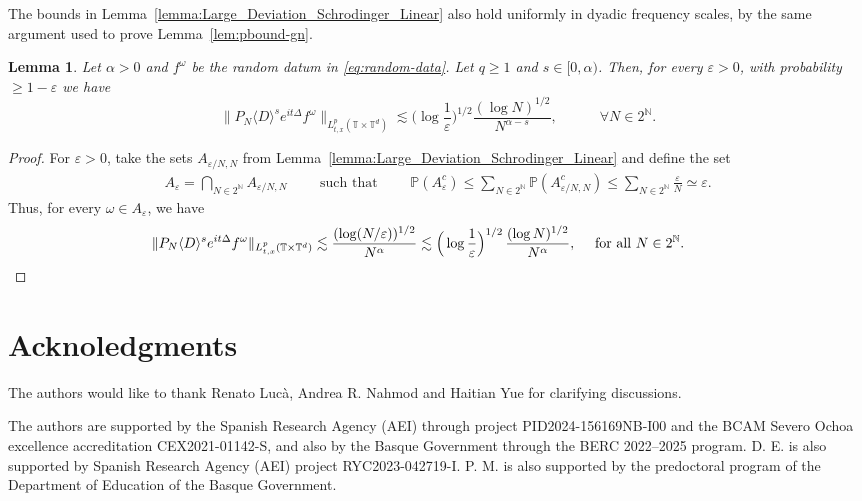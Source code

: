 \documentclass[11pt, xcolor = dvipsnames,reqno
]{amsart}
\newtheorem{lem}[thm]{Lemma}
\theoremstyle{definition}
\theoremstyle{remark}
\begin{document}
The bounds in Lemma~\ref{lemma:Large_Deviation_Schrodinger_Linear} also hold uniformly in dyadic frequency scales, by the same argument used to prove Lemma~\ref{lem:pbound-gn}. 
\begin{lem}\label{lemma:Strichartz_Prob_Uniform}
Let $\alpha > 0$ and $f^{\omega}$ be the random datum in \eqref{eq:random-data}. 
Let $q \geq 1$ and  $s \in [0,\alpha)$.
Then, for every $\varepsilon > 0$, with probability $\geq 1 - \varepsilon$ we have 
\begin{equation}\label{eq:Lp_bound-Prob_APP}
        \lVert  P_{N} \langle D \rangle^s e^{it\Delta}f^\omega  \rVert_{L_{t,x}^p(\mathbb{T} \times \mathbb{T}^d)}
        \lesssim \Big( \log \frac{1}{\varepsilon} \Big)^{1/2} \frac{(\log N )^{1/2}}{N^{\alpha - s}}, 
        \qquad \quad \forall N \in 2^{\mathbb N}.
    \end{equation}
\end{lem}
\begin{proof}
For $\varepsilon > 0$, 
take the sets $A_{\varepsilon/N, N}$ from  Lemma~\ref{lemma:Large_Deviation_Schrodinger_Linear} and define the set 
\begin{align}
    A_{\varepsilon} = \bigcap_{N \in 2^{\mathbb N}} A_{\varepsilon/N, N}
    \qquad \text{ such that } \qquad 
    \mathbb P(A_{\varepsilon}^c) \leq \sum_{N \in 2^{\mathbb N}} \mathbb P(A_{\varepsilon/N, N}^c) \leq \sum_{N \in 2^{\mathbb N}}  \frac{\varepsilon}{N} \simeq \varepsilon. 
\end{align}
Thus, for every $\omega \in A_\varepsilon$, we have 
\begin{align}
    \hspace{1.5cm} \| P_N \langle D \rangle^s e^{it\Delta}f^\omega \|_{L^p_{t,x}(\mathbb{T} \times \mathbb{T}^d)} \lesssim \frac{( \log (N/\varepsilon) )^{1/2}}{N^{\alpha}} \lesssim  \Big( \log \frac{1}{\varepsilon} \Big)^{1/2} \, \frac{(\log N)^{1/2} }{N^{\alpha}}, 
    \quad \text{ for all } N \in 2^{\mathbb N}.
    \hspace{2.5cm}  \qedhere
\end{align}
\end{proof}

\section*{Acknoledgments}
The authors would like to thank Renato Lucà, Andrea R. Nahmod and Haitian Yue for clarifying discussions. 

The authors are supported by the Spanish Research Agency (AEI) through project PID2024-156169NB-I00 and the BCAM Severo Ochoa excellence
accreditation CEX2021-01142-S, and also by the Basque Government through the BERC 2022–2025 program.
%
D. E. is also supported by Spanish Research Agency (AEI) project RYC2023-042719-I.
%
P. M. is also supported by the predoctoral program of the Department of Education of the Basque Government.



\printbibliography
\end{document}
